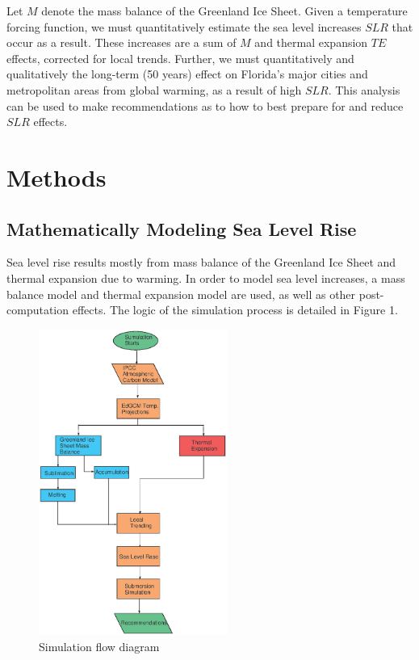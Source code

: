 \documentclass[12pt,a4paper,titlepage]{article}
\begin{document}
Let $M$ denote the mass balance of the Greenland Ice Sheet. Given
a temperature forcing function, we must quantitatively estimate
the sea level increases $SLR$ that occur as a result. These
increases are a sum of $M$ and thermal expansion $TE$ effects,
corrected for local trends. Further, we must quantitatively and
qualitatively the long-term (50 years) effect on Florida's major
cities and metropolitan areas from global warming, as a result of
high $SLR$. This analysis can be used to make recommendations as
to how to best prepare for and reduce $SLR$ effects.

\section{Methods}

\subsection{Mathematically Modeling Sea Level Rise}

Sea level rise results mostly from mass balance of the Greenland
Ice Sheet and thermal expansion due to warming. In order to model
sea level increases, a mass balance model and thermal expansion
model are used, as well as other post-computation effects. The
logic of the simulation process is detailed in Figure 1.

\begin{figure}[!htb]
\centering
\includegraphics[width=0.55\textwidth]{fig01.eps}
\caption{Simulation flow diagram}
\end{figure}
\end{document}
